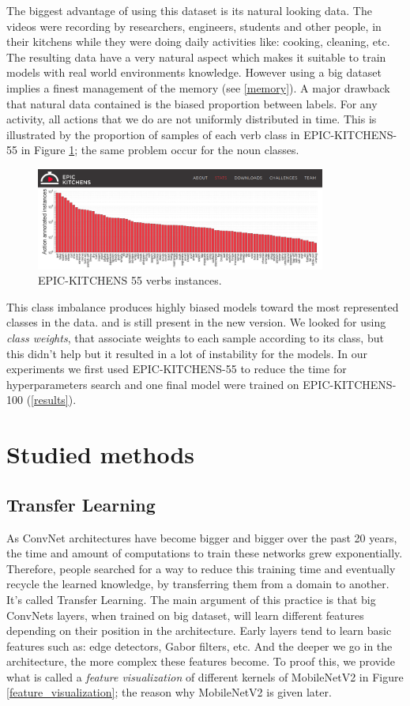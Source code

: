 \documentclass[12pt, a4paper]{report}
\begin{document}
				The biggest advantage of using this dataset is its natural looking data.
				The videos were recording by researchers, engineers, students and other people, in their kitchens while they were doing daily activities like: cooking, cleaning, etc.
				The resulting data have a very natural aspect which makes it suitable to train models with real world environments knowledge.
				However using a big dataset implies a finest management of the memory (see \ref{memory}).
				A major drawback that natural data contained is the biased proportion between labels.
				For any activity, all actions that we do are not uniformly distributed in time.
				This is illustrated by the proportion of samples of each verb class in EPIC-KITCHENS-55 in Figure \ref{epic_55_imbalance}; the same problem occur for the noun classes.
				\begin{figure}[h!]
					\centering
					\includegraphics[width=0.85\textwidth]{EPIC-55 data imbalance.png}
					\caption{EPIC-KITCHENS 55 verbs instances.}
					\label{epic_55_imbalance}
				\end{figure}
				This class imbalance produces highly biased models toward the most represented classes in the data. and is still present in the new version.
				We looked for using {\itshape class weights}, that associate weights to each sample according to its class, but this didn't help but it resulted in a lot of instability for the models.
				In our experiments we first used EPIC-KITCHENS-55 to reduce the time for hyperparameters search and one final model were trained on EPIC-KITCHENS-100 (\ref{results}).
		\section{Studied methods}
			\subsection{Transfer Learning}
				As ConvNet architectures have become bigger and bigger over the past 20 years, the time and amount of computations to train these networks grew exponentially.
				Therefore, people searched for a way to reduce this training time and eventually recycle the learned knowledge, by transferring them from a domain to another.
				It's called Transfer Learning.
				The main argument of this practice is that big ConvNets layers, when trained on big dataset, will learn different features depending on their position in the architecture.
				Early layers tend to learn basic features such as: edge detectors, Gabor filters, etc.
				And the deeper we go in the architecture, the more complex these features become.
				To proof this, we provide what is called a {\itshape feature visualization} of different kernels of MobileNetV2 in Figure \ref{feature_visualization}; the reason why MobileNetV2 is given later.
\end{document}
